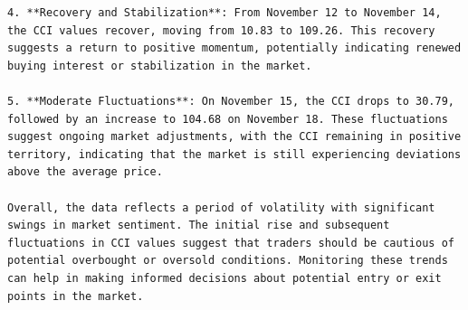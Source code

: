 \begin{tcolorbox}
\begin{lstlisting}[style=agentbase]
4. **Recovery and Stabilization**: From November 12 to November 14, the CCI values recover, moving from 10.83 to 109.26. This recovery suggests a return to positive momentum, potentially indicating renewed buying interest or stabilization in the market.

5. **Moderate Fluctuations**: On November 15, the CCI drops to 30.79, followed by an increase to 104.68 on November 18. These fluctuations suggest ongoing market adjustments, with the CCI remaining in positive territory, indicating that the market is still experiencing deviations above the average price.

Overall, the data reflects a period of volatility with significant swings in market sentiment. The initial rise and subsequent fluctuations in CCI values suggest that traders should be cautious of potential overbought or oversold conditions. Monitoring these trends can help in making informed decisions about potential entry or exit points in the market.
\end{lstlisting}
\end{tcolorbox}

